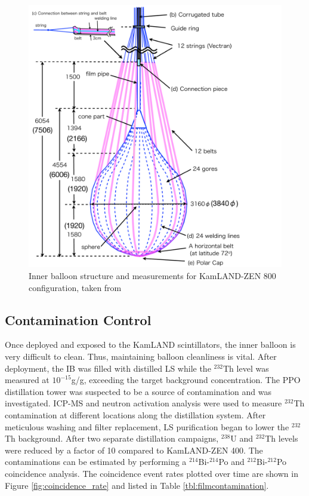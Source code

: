\begin{figure}[htb]
	\centering
	\includegraphics[scale=0.5]{ballonstructure.png}
	\caption{Inner balloon structure and measurements for KamLAND-ZEN 800 configuration, taken from \cite{ozaki_phd}}
	\label{fig:balloon_structure}
\end{figure}


\subsection*{Contamination Control}
Once deployed and exposed to the KamLAND scintillators, the inner balloon is very difficult to clean. Thus, maintaining balloon cleanliness is vital. After deployment, the IB was filled with distilled LS while the $^{232}$Th level was measured at $10^{-15}$g/g, exceeding the target background concentration. The PPO distillation tower was suspected to be a source of contamination and was investigated. ICP-MS and neutron activation analysis were used to measure $^{232}$Th contamination at different locations along the distillation system. After meticulous washing and filter replacement, LS purification began to lower the $^{232}$Th background. After two separate distillation campaigns, $^{238}$U and $^{232}$Th levels were reduced by a factor of 10 compared to KamLAND-ZEN 400. The contaminations can be estimated by performing a $^{214}$Bi-$^{214}$Po and $^{212}$Bi-$^{212}$Po coincidence analysis. The coincidence event rates plotted over time are shown in Figure \ref{fig:coincidence_rate} and listed in Table \ref{tbl:filmcontamination}.

